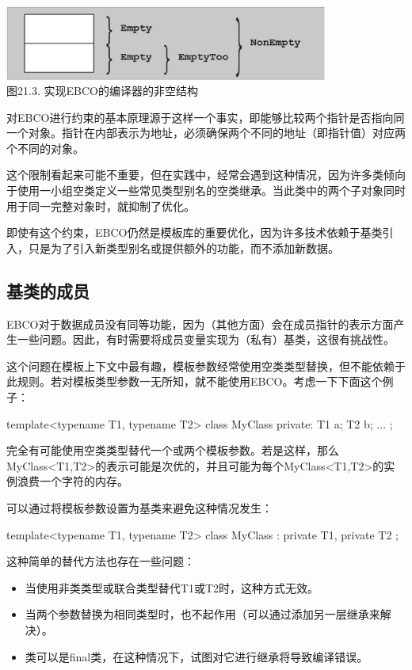 \begin{center}
\includegraphics[width=0.8\textwidth]{part3/ch21/images/3.png} \\
图21.3. 实现EBCO的编译器的非空结构
\end{center}

对EBCO进行约束的基本原理源于这样一个事实，即能够比较两个指针是否指向同一个对象。指针在内部表示为地址，必须确保两个不同的地址（即指针值）对应两个不同的对象。

这个限制看起来可能不重要，但在实践中，经常会遇到这种情况，因为许多类倾向于使用一小组空类定义一些常见类型别名的空类继承。当此类中的两个子对象同时用于同一完整对象时，就抑制了优化。

即使有这个约束，EBCO仍然是模板库的重要优化，因为许多技术依赖于基类引入，只是为了引入新类型别名或提供额外的功能，而不添加新数据。

\subsection{基类的成员}

EBCO对于数据成员没有同等功能，因为（其他方面）会在成员指针的表示方面产生一些问题。因此，有时需要将成员变量实现为（私有）基类，这很有挑战性。

这个问题在模板上下文中最有趣，模板参数经常使用空类类型替换，但不能依赖于此规则。若对模板类型参数一无所知，就不能使用EBCO。考虑一下下面这个例子：

\begin{cpp}
template<typename T1, typename T2>
class MyClass {
	private:
	T1 a;
	T2 b;
	...
};
\end{cpp}

完全有可能使用空类类型替代一个或两个模板参数。若是这样，那么MyClass<T1,T2>的表示可能是次优的，并且可能为每个MyClass<T1,T2>的实例浪费一个字符的内存。

可以通过将模板参数设置为基类来避免这种情况发生：

\begin{cpp}
template<typename T1, typename T2>
class MyClass : private T1, private T2 {};
\end{cpp}

这种简单的替代方法也存在一些问题：

\begin{itemize}
\item 
当使用非类类型或联合类型替代T1或T2时，这种方式无效。

\item 
当两个参数替换为相同类型时，也不起作用（可以通过添加另一层继承来解决）。

\item 
类可以是final类，在这种情况下，试图对它进行继承将导致编译错误。
\end{itemize}

